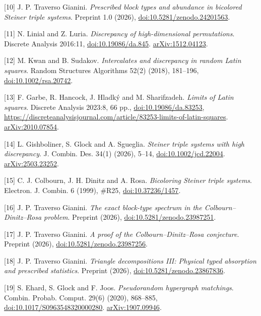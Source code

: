 \documentclass[english,11pt,a4paper]{article}
\begin{document}
{[}10{]} J. P. Traverso Gianini. \emph{Prescribed block types and abundance in bicolored Steiner triple systems}. Preprint 1.0 (2026), \href{https://doi.org/10.5281/zenodo.24201563}{doi:10.5281/zenodo.24201563}.

{[}11{]} N. Linial and Z. Luria. \emph{Discrepancy of high-dimensional permutations}. Discrete Analysis 2016:11, \href{https://doi.org/10.19086/da.845}{doi:10.19086/da.845}. \href{https://arxiv.org/abs/1512.04123}{arXiv:1512.04123}.

{[}12{]} M. Kwan and B. Sudakov. \emph{Intercalates and discrepancy in random Latin squares}. Random Structures Algorithms 52(2) (2018), 181--196, \href{https://doi.org/10.1002/rsa.20742}{doi:10.1002/rsa.20742}.

{[}13{]} F. Garbe, R. Hancock, J. Hladký and M. Sharifzadeh. \emph{Limits of Latin squares}. Discrete Analysis 2023:8, 66 pp., \href{https://doi.org/10.19086/da.83253}{doi:10.19086/da.83253}, \url{https://discreteanalysisjournal.com/article/83253-limits-of-latin-squares}. \href{https://arxiv.org/abs/2010.07854}{arXiv:2010.07854}.

{[}14{]} L. Gishboliner, S. Glock and A. Sgueglia. \emph{Steiner triple systems with high discrepancy}. J. Combin. Des. 34(1) (2026), 5--14, \href{https://doi.org/10.1002/jcd.22004}{doi:10.1002/jcd.22004}. \href{https://arxiv.org/abs/2503.23252}{arXiv:2503.23252}.

{[}15{]} C. J. Colbourn, J. H. Dinitz and A. Rosa. \emph{Bicoloring Steiner triple systems}. Electron. J. Combin. 6 (1999), \#R25, \href{https://doi.org/10.37236/1457}{doi:10.37236/1457}.

{[}16{]} J. P. Traverso Gianini. \emph{The exact block-type spectrum in the Colbourn--Dinitz--Rosa problem}. Preprint (2026), \href{https://doi.org/10.5281/zenodo.23987251}{doi:10.5281/zenodo.23987251}.

{[}17{]} J. P. Traverso Gianini. \emph{A proof of the Colbourn--Dinitz--Rosa conjecture}. Preprint (2026), \href{https://doi.org/10.5281/zenodo.23987256}{doi:10.5281/zenodo.23987256}.

{[}18{]} J. P. Traverso Gianini. \emph{Triangle decompositions III: Physical typed absorption and prescribed statistics}. Preprint (2026), \href{https://doi.org/10.5281/zenodo.23867836}{doi:10.5281/zenodo.23867836}.

{[}19{]} S. Ehard, S. Glock and F. Joos. \emph{Pseudorandom hypergraph matchings}. Combin. Probab. Comput. 29(6) (2020), 868--885, \href{https://doi.org/10.1017/S0963548320000280}{doi:10.1017/S0963548320000280}. \href{https://arxiv.org/abs/1907.09946}{arXiv:1907.09946}.
\end{document}
